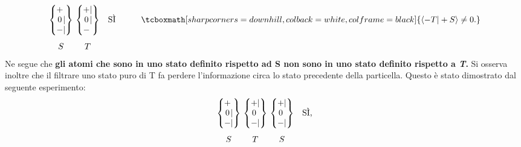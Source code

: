 \documentclass[a4paper,12pt,oneside]{book}
\begin{document}
	\begin{equation}
		\begin{matrix}
		\begin{Bmatrix}
			\makebox[\widthof{$-$}]{$+$}\makebox[\widthof{$|$}]{$\ $} \\ \makebox[\widthof{$-$}]{$0$}|\\ - | 
		\end{Bmatrix} \\[0.7cm]
			S
		\end{matrix} \
		\begin{matrix}
		\begin{Bmatrix}
 			\makebox[\widthof{$-$}]{$+$} | \\ \makebox[\widthof{$-$}]{$0$} | \\ - \makebox[\widthof{$|$}]{$\ $} 
		\end{Bmatrix} & \textrm{SÌ} & \qquad\tcboxmath[sharp corners=downhill, colback=white, colframe=black]{\langle -T | +S \rangle \neq 0.} \\[0.7cm]
			T & &
		\end{matrix}
		\label{SG7}
	\end{equation}
Ne segue che \textbf{gli atomi che sono in uno stato definito rispetto ad S non sono in uno stato definito rispetto a \emph{T}.}
Si osserva inoltre che il filtrare uno stato puro di T fa perdere l'informazione circa lo stato precedente della particella. Questo è stato dimostrato dal seguente esperimento:
	\begin{equation}
		\begin{matrix}
		\begin{Bmatrix}
			\makebox[\widthof{$-$}]{$+$}\makebox[\widthof{$|$}]{$\ $} \\ \makebox[\widthof{$-$}]{$0$}|\\ - | 
		\end{Bmatrix} \\[0.7cm]
			S
		\end{matrix} \
		\begin{matrix}
		\begin{Bmatrix}
 			\makebox[\widthof{$-$}]{$+$} | \\ \makebox[\widthof{$-$}]{$0$}\makebox[\widthof{$|$}]{$\ $} \\ - | 
		\end{Bmatrix}  \\[0.7cm]
			T
		\end{matrix}\
		\begin{matrix}
		\begin{Bmatrix}
 			\makebox[\widthof{$-$}]{$+$} | \\ \makebox[\widthof{$-$}]{$0$}\makebox[\widthof{$|$}]{$\ $}\\ - | 
		\end{Bmatrix} &\textrm{SÌ,} \\[0.7cm]
			S &
		\end{matrix}
	\label{SG8}
	\end{equation}
\end{document}
